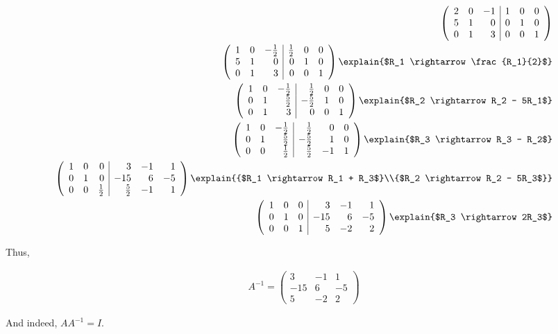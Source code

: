 \begin{align*}
  \left(
    \begin{array}{rrr|rrr}  %
      2 & 0 & -1 & 1 & 0 & 0\\
      5 & 1 &  0 & 0 & 1 & 0\\
      0 & 1 &  3 & 0 & 0 & 1
    \end{array}
  \right)\\
  \left(
    \begin{array}{rrr|rrr}
      1 & 0 & - \frac{1}{2} & \frac{1}{2} & 0 & 0\\
      5 & 1 &             0 &           0 & 1 & 0\\
      0 & 1 &             3 &           0 & 0 & 1
    \end{array}
  \right)
  \explain{$R_1 \rightarrow \frac{R_1}{2}$}\\
  \left(
    \begin{array}{rrr|rrr}
      1 & 0 & - \frac{1}{2} &  \frac{1}{2} & 0 & 0\\
      0 & 1 &   \frac{5}{2} & -\frac{5}{2} & 1 & 0\\
      0 & 1 &             3 &            0 & 0 & 1
    \end{array}
  \right)
  \explain{$R_2 \rightarrow R_2 - 5R_1$}\\
  \left(
    \begin{array}{rrr|rrr}
      1 & 0 & - \frac{1}{2} &  \frac{1}{2} &  0 & 0\\
      0 & 1 &   \frac{5}{2} & -\frac{5}{2} &  1 & 0\\
      0 & 0 &   \frac{1}{2} &  \frac{5}{2} & -1 & 1
    \end{array}
  \right)
  \explain{$R_3 \rightarrow R_3 - R_2$}\\
  \left(
    \begin{array}{rrr|rrr}
      1 & 0 &             0 &            3 & -1 &  1\\
      0 & 1 &             0 &          -15 &  6 & -5\\
      0 & 0 &   \frac{1}{2} &  \frac{5}{2} & -1 &  1
    \end{array}
  \right)
  \explain{{$R_1 \rightarrow R_1 + R_3$}\\{$R_2 \rightarrow R_2 - 5R_3$}}\\
  \left(
    \begin{array}{rrr|rrr}
      1 & 0 & 0 &   3 & -1 &  1\\
      0 & 1 & 0 & -15 &  6 & -5\\
      0 & 0 & 1 &   5 & -2 &  2
    \end{array}
  \right)
  \explain{$R_3 \rightarrow 2R_3$}
\end{align*}

Thus,

\begin{align*}
  A^{-1} =
  \begin{pmatrix}
    3 & -1 & 1\\
    -15 & 6 & -5\\
    5 & -2 & 2
  \end{pmatrix}
\end{align*}

And indeed, $AA^{-1} = I$.

